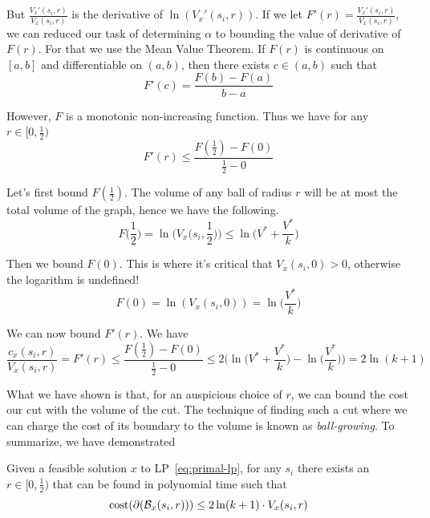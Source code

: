 But $\frac{V_x'(s_i, r)}{V_x(s_i, r)}$ is the derivative of $\ln (V_x'(s_i, r))$. If we let $F'(r) = \frac{V_x'(s_i, r)}{V_x(s_i, r)}$, we can reduced our task of determining $\alpha$ to bounding the value of derivative of $F(r)$. For that we use the Mean Value Theorem. If $F(r)$ is continuous on $[a, b]$ and differentiable on $(a, b)$, then there exists $c \in (a, b)$ such that
\begin{equation*}
F'(c) = \frac{F(b) - F(a)}{b - a}
\end{equation*}

However, $F$ is a monotonic non-increasing function. Thus we have for any $r \in [0, \frac{1}{2})$
\begin{equation*}
F'(r)
\leq \frac{F(\frac{1}{2}) - F(0)}{\frac{1}{2} - 0}
\end{equation*}

Let's first bound $F(\frac{1}{2})$. The volume of any ball of radius $r$ will be at most the total volume of the graph, hence we have the following.
\begin{equation*}
F\bigg( \frac{1}{2} \bigg)
= \ln \bigg( V_x \bigg( s_i, \frac{1}{2} \bigg) \bigg)
\leq \ln\bigg(V^* + \frac{V^*}{k}\bigg)
\end{equation*}

Then we bound $F(0)$. This is where it's critical that $V_x(s_i, 0) > 0$, otherwise the logarithm is undefined!
\begin{equation*}
F(0) = \ln(V_x(s_i, 0)) = \ln\bigg( \frac{V^*}{k} \bigg)
\end{equation*}

We can now bound $F'(r)$. We have
\begin{equation*}
\frac{c_x(s_i, r)}{V_x(s_i, r)}
= F'(r)
\leq \frac{F(\frac{1}{2}) - F(0)}{\frac{1}{2} - 0}
\leq 2 \bigg( \ln\bigg(V^* + \frac{V^*}{k}\bigg) - \ln\bigg( \frac{V^*}{k} \bigg) \bigg)
= 2 \ln(k + 1)
\end{equation*}

What we have shown is that, for an auspicious choice of $r$, we can bound the cost our cut with the volume of the cut. The technique of finding such a cut where we can charge the cost of its boundary to the volume is known as \emph{ball-growing}. To summarize, we have demonstrated
\begin{theorem}\label{thm:region-growing}
Given a feasible solution $x$ to LP~\ref{eq:primal-lp}, for any $s_i$ there exists an $r \in [0, \frac{1}{2})$ that can be found in polynomial time such that
\begin{equation*}
\textup{cost}(\partial(\mathcal{B}_x(s_i, r))) \leq 2 \ln(k+1) \cdot V_x(s_i, r)
\end{equation*}
\end{theorem}

